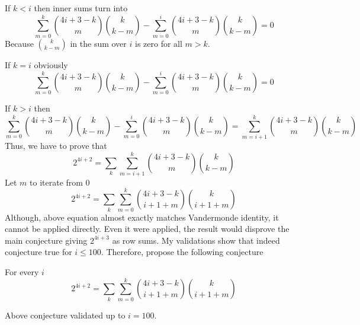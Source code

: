 If $k < i$ then inner sums turn into
\begin{equation*}
    \sum_{m=0}^{k} \binom{4i+3-k}{m} \binom{k}{k-m} - \sum_{m=0}^{i} \binom{4i+3-k}{m} \binom{k}{k-m}
    = 0
\end{equation*}
Because $\binom{k}{k-m}$ in the sum over $i$ is zero for all $m > k$.

If $k = i$ obviously
\begin{equation*}
    \sum_{m=0}^{k} \binom{4i+3-k}{m} \binom{k}{k-m} - \sum_{m=0}^{i} \binom{4i+3-k}{m} \binom{k}{k-m} = 0
\end{equation*}

If $k > i$ then
\begin{equation*}
    \sum_{m=0}^{k} \binom{4i+3-k}{m} \binom{k}{k-m} - \sum_{m=0}^{i} \binom{4i+3-k}{m} \binom{k}{k-m}
    = \sum_{m=i+1}^{k} \binom{4i+3-k}{m} \binom{k}{k-m}
\end{equation*}
Thus, we have to prove that
\begin{equation*}
    2^{4i+2} = \sum_{k} \sum_{m=i+1}^{k} \binom{4i+3-k}{m} \binom{k}{k-m}
\end{equation*}
Let $m$ to iterate from 0
\begin{equation*}
    2^{4i+2} = \sum_{k} \sum_{m=0}^{k} \binom{4i+3-k}{i+1+m} \binom{k}{i+1+m}
\end{equation*}
Although, above equation almost exactly matches Vandermonde identity, it cannot be applied directly.
Even it were applied, the result would disprove the main conjecture giving $2^{4i+3}$ as row sums.
My validations show that indeed conjecture true for $i \leq 100$.
Therefore, propose the following conjecture
\begin{conjecture} For every $i$
    \begin{equation*}
        2^{4i+2} = \sum_{k} \sum_{m=0}^{k} \binom{4i+3-k}{i+1+m} \binom{k}{i+1+m}
    \end{equation*}
\end{conjecture}
Above conjecture validated up to $i=100$.
